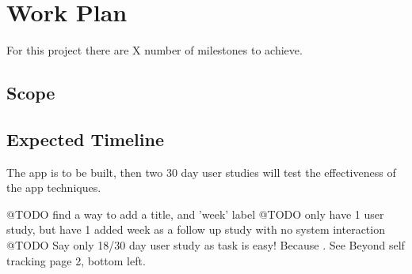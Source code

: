 
\newpage
\section{Work Plan}

For this project there are X number of milestones to achieve.


\subsection*{Scope}

\subsection*{Expected Timeline}

The app is to be built, then two 30 day user studies will test the effectiveness of the app techniques.




@TODO find a way to add a title, and 'week' label
@TODO only have 1 user study, but have 1 added week as a follow up study with no system interaction
@TODO Say only 18/30 day user study as task is easy! Because \cite{article_how_habits_formed_modelling_habit_formation}. See Beyond self tracking page 2, bottom left.


